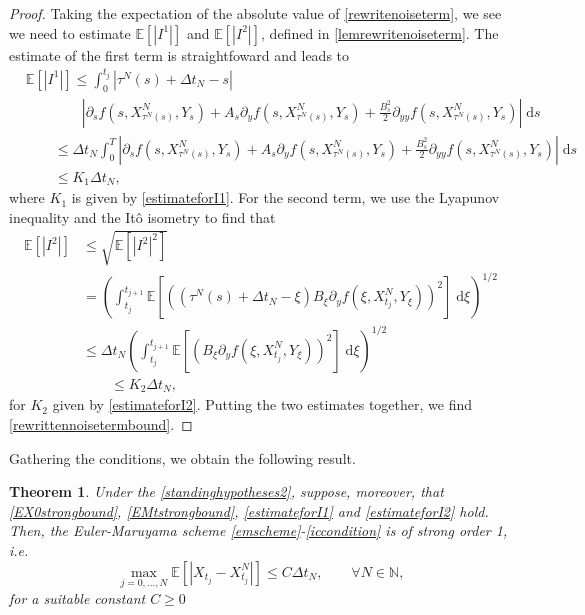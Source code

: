 \documentclass[reqno,12pt]{amsart}
\theoremstyle{plain}%
\newtheorem{thm}{Theorem}[section]
\theoremstyle{definition}
\begin{document}
\begin{proof}
    Taking the expectation of the absolute value of \eqref{rewritenoiseterm}, we see we need to estimate $\mathbb{E}[|I^1|]$ and $\mathbb{E}[|I^2|]$, defined in \cref{lemrewritenoiseterm}. The estimate of the first term is straightfoward and leads to
    \begin{align*}
        & \mathbb{E}[|I^1|] \leq \int_0^{t_j} |\tau^N(s) + \Delta t_N - s| \\
        & \qquad \qquad \left|\partial_s f(s, X_{\tau^N(s)}^N, Y_s) + A_s \partial_y f(s, X_{\tau^N(s)}^N, Y_s)  + \frac{B_s^2}{2}\partial_{yy}f(s, X_{\tau^N(s)}^N, Y_s) \right| \;\mathrm{d}s \\
        & \qquad \leq \Delta t_N \int_0^{T}\left|\partial_s f(s, X_{\tau^N(s)}^N, Y_s) + A_s \partial_y f(s, X_{\tau^N(s)}^N, Y_s)  + \frac{B_s^2}{2}\partial_{yy}f(s, X_{\tau^N(s)}^N, Y_s) \right| \;\mathrm{d}s \\
        & \qquad \leq K_1 \Delta t_N,
    \end{align*}
    where $K_1$ is given by \eqref{estimateforI1}. For the second term, we use the Lyapunov inequality and the It\^o isometry to find that
    \begin{align*}
        \mathbb{E}[|I^2|] & \leq \sqrt{\mathbb{E}[|I^2|^2]} \\
        & = \left(\int_{t_j}^{t_{j+1}}  \mathbb{E}\left[\left((\tau^N(s) + \Delta t_N - \xi) B_\xi \partial_y f(\xi, X_{t_j}^N, Y_\xi)\right)^2\right] \;\mathrm{d}\xi \right)^{1/2} \\
        & \leq \Delta t_N \left(\int_{t_j}^{t_{j+1}}  \mathbb{E}\left[\left(B_\xi \partial_y f(\xi, X_{t_j}^N, Y_\xi)\right)^2\right] \;\mathrm{d}\xi \right)^{1/2} \\
        & \qquad \leq K_2 \Delta t_N,
    \end{align*}
    for $K_2$ given by \eqref{estimateforI2}. Putting the two estimates together, we find \eqref{rewrittennoisetermbound}.
\end{proof}

Gathering the conditions, we obtain the following result.
\begin{thm}
    \label{thmforItonoise}
    Under the \cref{standinghypotheses2}, suppose, moreover, that \eqref{EX0strongbound}, \eqref{EMtstrongbound}, \eqref{estimateforI1} and \eqref{estimateforI2} hold. Then, the Euler-Maruyama scheme \eqref{emscheme}-\eqref{iccondition} is of strong order 1, i.e.
    \begin{equation}
      \label{thmitogeneralboundstrongorder}
        \max_{j=0, \ldots, N}\mathbb{E}\left[ \left| X_{t_j} - X_{t_j}^N \right| \right] \leq C \Delta t_N, \qquad \forall N \in \mathbb{N},
    \end{equation}
    for a suitable constant $C \geq 0$
\end{thm}
\end{document}
